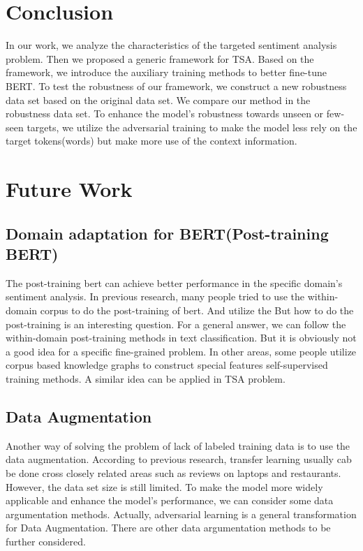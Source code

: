 \documentclass[fyp]{socreport}
\begin{document}
\section{Conclusion}
In our work, we analyze the characteristics of the targeted sentiment analysis problem. Then we proposed a generic framework for TSA. Based on the framework, we introduce the auxiliary training methods to better fine-tune BERT. To test the robustness of our framework, we construct a new robustness data set based on the original data set. We compare our method in the robustness data set. To enhance the model's robustness towards unseen or few-seen targets, we utilize the adversarial training to make the model less rely on the target tokens(words) but make more use of the context information.




\section{Future Work}
\subsection{Domain adaptation for BERT(Post-training BERT)}
The post-training bert can achieve better performance in the specific domain's sentiment analysis. In previous research, many people tried to use the within-domain corpus to do the post-training of bert. And utilize the
But how to do the post-training is an interesting question. For a general answer, we can follow the within-domain post-training methods in text classification. But it is obviously not a good idea for a specific fine-grained problem. In other areas, some people utilize corpus based knowledge graphs to construct special features self-supervised training methods. A similar idea can be applied in TSA problem.


\subsection{Data Augmentation}
Another way of solving the problem of lack of labeled training data is to use the data augmentation. According to previous research, transfer learning usually cab be done cross closely related areas such as reviews on laptops and restaurants. However, the data set size is still limited. To make the model more widely applicable and enhance the model's performance, we can consider some data argumentation methods. Actually, adversarial learning is a general transformation for Data Augmentation. There are other data argumentation methods to be further considered.
\end{document}
